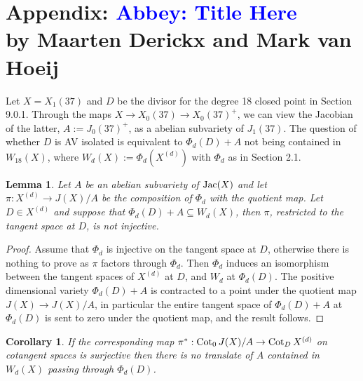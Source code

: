 \documentclass[11pt,reqno]{amsart}
\theoremstyle{plain}
\newtheorem{lemma}[theorem]{Lemma}
\newtheorem{corollary}[theorem]{Corollary}
\theoremstyle{definition}
\newcommand{\abbey}[1]{\textcolor{blue}{Abbey: #1}}
\begin{document}
\section{Appendix: \abbey{Title Here}\\ by Maarten Derickx and Mark van Hoeij}




Let $X = X_1(37)$ and $D$ be the divisor for the degree 18 closed point in Section 9.0.1.
Through the maps $X \rightarrow X_0(37) \rightarrow X_0(37)^+$, we can view the Jacobian of the latter, $A :=J_0(37)^+$,
as a abelian subvariety of $J_1(37)$.
The question of whether $D$ is %
AV isolated is equivalent to $\Phi_d(D) + A$ not being contained in $W_{18}(X)$,
where $W_d(X) := \Phi_d(X^{(d)})$ with $\Phi_d$ as in Section 2.1.



\begin{lemma}
Let $A$ be an abelian subvariety of ${\rm Jac}(X)$ and let
$\pi: X^{(d)} \rightarrow J(X)/A$ be the composition of $\Phi_d$ with the quotient map.
Let $D \in  X^{(d)}$ and suppose that $\Phi_d(D) + A \subseteq W_d(X)$,
then $\pi$, restricted to the tangent space at $D$, is not injective.
\end{lemma}



\begin{proof} Assume that $\Phi_d$ is injective on the tangent space at $D$,
otherwise there is nothing to prove as $\pi$ factors through $\Phi_d$.
Then $\Phi_d$ induces an isomorphism between the tangent spaces of $X^{(d)}$ at $D$, and $W_d$ at $\Phi_d(D)$.
The positive dimensional variety $\Phi_d(D) + A$ is contracted to a point under the quotient map
$J(X) \rightarrow J(X)/A$, in particular the entire tangent space of  $\Phi_d(D) + A$ at $\Phi_d(D)$
is sent to zero under the quotient map, and the result follows.
\end{proof}

\begin{corollary} If the corresponding map $\pi^* : {\rm Cot}_0 \,J(X)/A \rightarrow {\rm Cot}_D \,X^{(d)}$
on cotangent spaces is surjective then there is no translate of $A$ contained in $W_d(X)$ passing through $\Phi_d(D)$.
\end{corollary}
\end{document}
